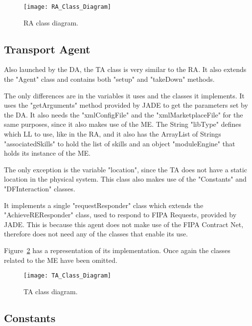 \begin{figure}[h!]
	\centering
	\texttt{[image: RA\_Class\_Diagram]}
	\caption{\acrlong{RA} class diagram.}
	\label{fig:ra_class_diagram}
\end{figure}

\subsection{Transport Agent}
\label{subsec:transport_agent}

Also launched by the \acrshort{DA}, the \acrlong{TA} class is very similar to the \acrlong{RA}. It also extends the "Agent" class and contains both "setup" and "takeDown" methods.

The only differences are in the variables it uses and the classes it implements. It uses the "getArguments" method provided by \acrshort{JADE} to get the parameters set by the \acrshort{DA}. It also needs the "xmlConfigFile" and the "xmlMarketplaceFile" for the same purposes, since it also makes use of the \acrshort{ME}. The String "libType" defines which \acrshort{LL} to use, like in the \acrshort{RA}, and it also has the ArrayList of Strings "associatedSkills" to hold the list of skills and an object "moduleEngine" that holds its instance of the \acrshort{ME}.

The only exception is the variable "location", since the \acrlong{TA} does not have a static location in the physical system. This class also makes use of the "Constants" and "DFInteraction" classes.

It implements a single "requestResponder" class which extends the "AchieveREResponder" class, used to respond to \acrshort{FIPA} Requests, provided by \acrshort{JADE}. This is because this agent does not make use of the \acrshort{FIPA} Contract Net, therefore does not need any of the classes that enable its use.

Figure~\ref{fig:ta_class_diagram} has a representation of its implementation. Once again the classes related to the \acrshort{ME} have been omitted.\\

\begin{figure}[h!]
	\centering
	\texttt{[image: TA\_Class\_Diagram]}
	\caption{\acrlong{TA} class diagram.}
	\label{fig:ta_class_diagram}
\end{figure}

\subsection{Constants}
\label{subsec:constants}

